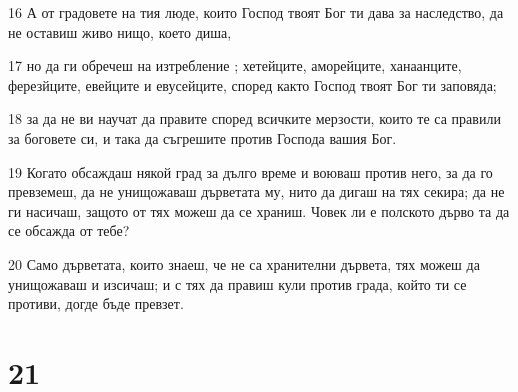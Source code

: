 \par 16 А от градовете на тия люде, които Господ твоят Бог ти дава за наследство, да не оставиш живо нищо, което диша,
\par 17 но да ги обречеш на изтребление ; хетейците, аморейците, ханаанците, ферезйците, евейците и евусейците, според както Господ твоят Бог ти заповяда;
\par 18 за да не ви научат да правите според всичките мерзости, които те са правили за боговете си, и така да съгрешите против Господа вашия Бог.
\par 19 Когато обсаждаш някой град за дълго време и воюваш против него, за да го превземеш, да не унищожаваш дърветата му, нито да дигаш на тях секира; да не ги насичаш, защото от тях можеш да се храниш. Човек ли е полското дърво та да се обсажда от тебе?
\par 20 Само дърветата, които знаеш, че не са хранителни дървета, тях можеш да унищожаваш и изсичаш; и с тях да правиш кули против града, който ти се противи, догде бъде превзет.

\chapter{21}

